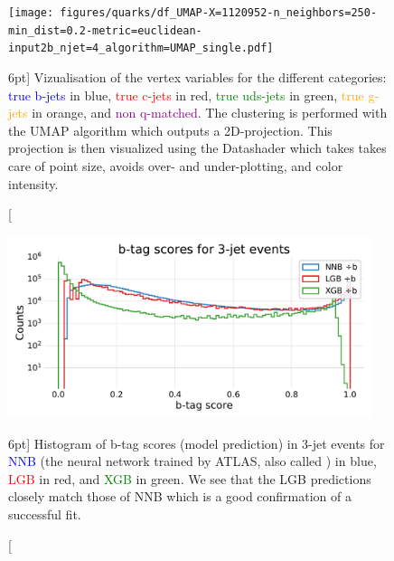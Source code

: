 \documentclass[a4paper, twoside, nobib]{tufte-book}
\newcommand{\code}[1]{\colorbox{light-gray}{\texttt{\detokenize{#1}}}}
\begin{document}
\begin{figure}
  \texttt{[image: figures/quarks/df\_UMAP-X=1120952-n\_neighbors=250-min\_dist=0.2-metric=euclidean-input2b\_njet=4\_algorithm=UMAP\_single.pdf]}
  \caption[UMAP vizualisation of vertex variables][6pt]
          {Vizualisation of the vertex variables for the different categories: \textcolor{blue}{true b-jets} in blue, \textcolor{red}{true c-jets} in red, \textcolor{green}{true uds-jets} in green, \textcolor{orange}{true g-jets} in orange, and \textcolor{purple}{non q-matched}. The clustering is performed with the UMAP algorithm which outputs a 2D-projection. This projection is then visualized using the Datashader which takes takes care of point size, avoids over- and under-plotting, and color intensity. 
          } 
  \label{fig:q:UMAP_vertex}
\end{figure}



\begin{figure}
  \includegraphics[width=0.95\textwidth, trim=0 0 0 30, clip]{figures/quarks/y_pred_3_jet_hist-down_sample=1.00-ML_vars=vertex-selection=b-ejet_min=4-n_iter_RS_lgb=99-n_iter_RS_xgb=9-cdot_cut=0.90-version=19.pdf}
  \caption[b-tag scores in 3-jet events][6pt]
          {Histogram of b-tag scores (model prediction) in 3-jet events for \textcolor{blue}{NNB} (the neural network trained by ATLAS, also called \code{nnbjet}) in blue, \textcolor{red}{LGB} in red, and \textcolor{green}{XGB} in green. We see that the LGB predictions closely match those of NNB which is a good confirmation of a successful fit.  
          } 
  \label{fig:q:btag_scores_3j}
\end{figure}
\end{document}
